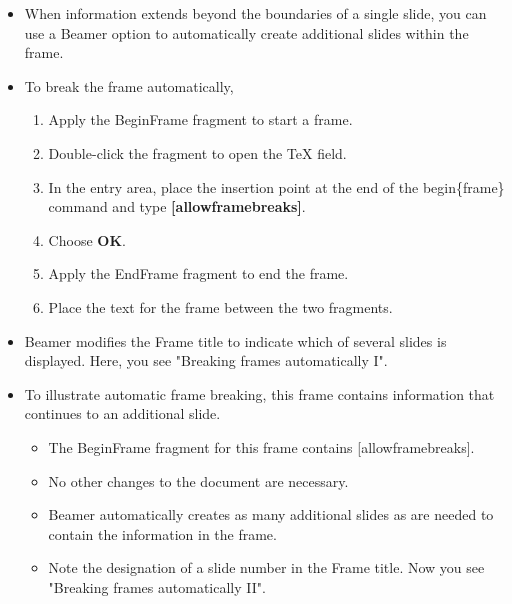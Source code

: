 \documentclass[notes=show,beamer]{beamer}
\begin{document}
\begin{frame}[allowframebreaks]%


\begin{itemize}
\item When information extends beyond the boundaries of a single slide, you
can use a Beamer option to automatically create additional slides within the
frame.

\item To break the frame automatically,

\begin{enumerate}
\item Apply the BeginFrame fragment to start a frame.

\item Double-click the fragment to open the TeX field.

\item In the entry area, place the insertion point at the end of the 
\TEXTsymbol{\backslash}begin\{frame\} command and type \textbf{%
[allowframebreaks]}.

\item Choose \textbf{OK}.

\item Apply the EndFrame fragment to end the frame.

\item Place the text for the frame between the two fragments.
\end{enumerate}

\item Beamer modifies the Frame title to indicate which of several slides is
displayed. Here, you see "Breaking frames automatically I".

\item To illustrate automatic frame breaking, this frame contains
information that continues to an additional slide.

\begin{itemize}
\item The BeginFrame fragment for this frame contains [allowframebreaks].

\item No other changes to the document are necessary.

\item Beamer automatically creates as many additional slides as are needed
to contain the information in the frame.

\item Note the designation of a slide number in the Frame title. Now you see
"Breaking frames automatically II".
\end{itemize}
\end{itemize}

\transboxout%
\end{frame}%
\end{document}
